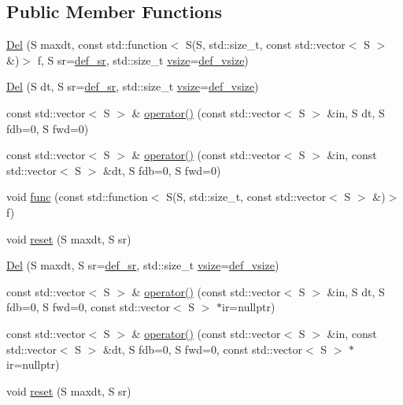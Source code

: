 \subsection*{Public Member Functions}
\begin{DoxyCompactItemize}
\item 
\hyperlink{class_aurora_1_1_del_ad2236892c8f3459010f7570bee8275a1}{Del} (S maxdt, const std\+::function$<$ S(S, std\+::size\+\_\+t, const std\+::vector$<$ S $>$ \&)$>$ f, S sr=\hyperlink{namespace_aurora_ad49263d809bea98dd422e95bc91bc03e}{def\+\_\+sr}, std\+::size\+\_\+t \hyperlink{class_aurora_1_1_snd_base_af9e21aaf411b17f7a8221c991ce5d291}{vsize}=\hyperlink{namespace_aurora_afaaddf667a06e7ce23c667a8b7295263}{def\+\_\+vsize})
\item 
\hyperlink{class_aurora_1_1_del_ae7ee559e909a215a6d8248d9c9a0ced8}{Del} (S dt, S sr=\hyperlink{namespace_aurora_ad49263d809bea98dd422e95bc91bc03e}{def\+\_\+sr}, std\+::size\+\_\+t \hyperlink{class_aurora_1_1_snd_base_af9e21aaf411b17f7a8221c991ce5d291}{vsize}=\hyperlink{namespace_aurora_afaaddf667a06e7ce23c667a8b7295263}{def\+\_\+vsize})
\item 
const std\+::vector$<$ S $>$ \& \hyperlink{class_aurora_1_1_del_a7061e3fc28fa7c9cace2f194c0c2933b}{operator()} (const std\+::vector$<$ S $>$ \&in, S dt, S fdb=0, S fwd=0)
\item 
const std\+::vector$<$ S $>$ \& \hyperlink{class_aurora_1_1_del_a7b07356cf07e48791929e7c99c907650}{operator()} (const std\+::vector$<$ S $>$ \&in, const std\+::vector$<$ S $>$ \&dt, S fdb=0, S fwd=0)
\item 
void \hyperlink{class_aurora_1_1_del_aeaf2a09c658c57e3e29793ea8af092d3}{func} (const std\+::function$<$ S(S, std\+::size\+\_\+t, const std\+::vector$<$ S $>$ \&)$>$ f)
\item 
void \hyperlink{class_aurora_1_1_del_a1d5f6aa043e47077b3c1654d884c77f1}{reset} (S maxdt, S sr)
\item 
\hyperlink{class_aurora_1_1_del_ab5fe2f7cee0b896f2d12932bb72fd925}{Del} (S maxdt, S sr=\hyperlink{namespace_aurora_ad49263d809bea98dd422e95bc91bc03e}{def\+\_\+sr}, std\+::size\+\_\+t \hyperlink{class_aurora_1_1_snd_base_af9e21aaf411b17f7a8221c991ce5d291}{vsize}=\hyperlink{namespace_aurora_afaaddf667a06e7ce23c667a8b7295263}{def\+\_\+vsize})
\item 
const std\+::vector$<$ S $>$ \& \hyperlink{class_aurora_1_1_del_ae65031a108546fdd299e50929b394bad}{operator()} (const std\+::vector$<$ S $>$ \&in, S dt, S fdb=0, S fwd=0, const std\+::vector$<$ S $>$ $\ast$ir=nullptr)
\item 
const std\+::vector$<$ S $>$ \& \hyperlink{class_aurora_1_1_del_a565d7b65191120a0251e83833bb62ea4}{operator()} (const std\+::vector$<$ S $>$ \&in, const std\+::vector$<$ S $>$ \&dt, S fdb=0, S fwd=0, const std\+::vector$<$ S $>$ $\ast$ir=nullptr)
\item 
void \hyperlink{class_aurora_1_1_del_a1d5f6aa043e47077b3c1654d884c77f1}{reset} (S maxdt, S sr)
\end{DoxyCompactItemize}


